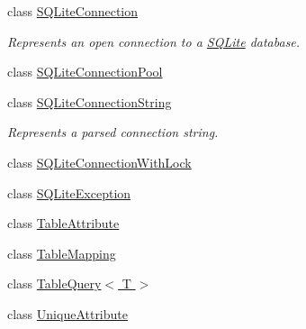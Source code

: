 \begin{DoxyCompactItemize}
class \hyperlink{class_s_q_lite_1_1_s_q_lite_connection}{S\+Q\+Lite\+Connection}
\begin{DoxyCompactList}\small\item\em Represents an open connection to a \hyperlink{namespace_s_q_lite}{S\+Q\+Lite} database. \end{DoxyCompactList}\item 
class \hyperlink{class_s_q_lite_1_1_s_q_lite_connection_pool}{S\+Q\+Lite\+Connection\+Pool}
\item 
class \hyperlink{class_s_q_lite_1_1_s_q_lite_connection_string}{S\+Q\+Lite\+Connection\+String}
\begin{DoxyCompactList}\small\item\em Represents a parsed connection string. \end{DoxyCompactList}\item 
class \hyperlink{class_s_q_lite_1_1_s_q_lite_connection_with_lock}{S\+Q\+Lite\+Connection\+With\+Lock}
\item 
class \hyperlink{class_s_q_lite_1_1_s_q_lite_exception}{S\+Q\+Lite\+Exception}
\item 
class \hyperlink{class_s_q_lite_1_1_table_attribute}{Table\+Attribute}
\item 
class \hyperlink{class_s_q_lite_1_1_table_mapping}{Table\+Mapping}
\item 
class \hyperlink{class_s_q_lite_1_1_table_query_3_01_t_01_4}{Table\+Query$<$ T $>$}
\item 
class \hyperlink{class_s_q_lite_1_1_unique_attribute}{Unique\+Attribute}
\end{DoxyCompactItemize}

